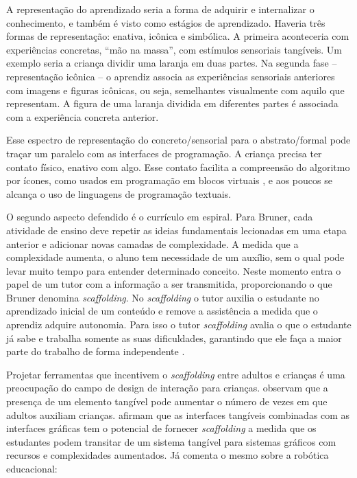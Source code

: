 A representação do aprendizado seria a forma de adquirir e internalizar o conhecimento, e também é visto como estágios de aprendizado. Haveria três formas de representação: enativa, icônica e simbólica. A primeira aconteceria com experiências concretas, “mão na massa”, com estímulos sensoriais tangíveis. Um exemplo seria a criança dividir uma laranja em duas partes. Na segunda fase – representação icônica – o aprendiz associa as experiências sensoriais anteriores com imagens e figuras icônicas, ou seja, semelhantes visualmente com aquilo que representam. A figura de uma laranja dividida em diferentes partes é associada com a experiência concreta anterior.

Esse espectro de representação do concreto/sensorial para o abstrato/formal pode traçar um paralelo com as interfaces de programação. A criança precisa ter contato físico, enativo com algo. Esse contato facilita a compreensão do algoritmo por ícones, como usados em programação em blocos virtuais \cite{flannery_designing_2013}, e aos poucos se alcança o uso de linguagens de programação textuais.

O segundo aspecto defendido é o currículo em espiral. Para Bruner, cada atividade de ensino deve repetir as ideias fundamentais lecionadas em uma etapa anterior e adicionar novas camadas de complexidade. A medida que a complexidade aumenta, o aluno tem necessidade de um auxílio, sem o qual pode levar muito tempo para entender determinado conceito. Neste momento entra o papel de um tutor com a informação a ser transmitida, proporcionando o que Bruner denomina \textit{scaffolding}. No \textit{scaffolding} o tutor auxilia o estudante no aprendizado inicial de um conteúdo \cite{valkenburg_joining_2010} e remove a assistência a medida que o aprendiz adquire autonomia. Para isso o tutor \textit{scaffolding} avalia o que o estudante já sabe e trabalha somente as suas dificuldades, garantindo que ele faça a maior parte do trabalho de forma independente \cite{valkenburg_joining_2010}.

Projetar ferramentas que incentivem o \textit{scaffolding} entre adultos e crianças é uma preocupação do campo de design de interação para crianças.  observam que a presença de um elemento tangível pode aumentar o número de vezes em que adultos auxiliam crianças.  afirmam que as interfaces tangíveis combinadas com as interfaces gráficas tem o potencial de fornecer \textit{scaffolding} a medida que os estudantes podem transitar de um sistema tangível para sistemas gráficos com recursos e complexidades aumentados. Já  comenta o mesmo sobre a robótica educacional: 

